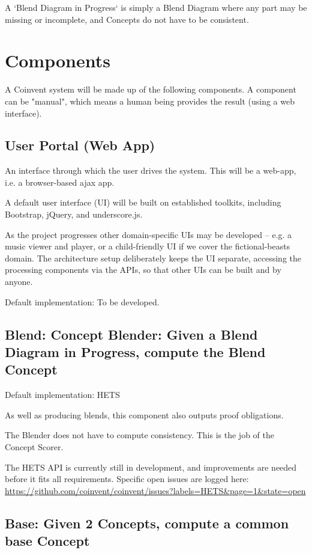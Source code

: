 A `Blend Diagram in Progress` is simply a Blend Diagram where any part may be missing or incomplete, and Concepts do not have to be consistent. 


\section{Components}\label{sec:components}

A Coinvent system will be made up of the following components.
A component can be "manual", which means a human being provides the result (using a web interface).

\subsection{User Portal (Web App)}\label{sec:userportal}
An interface through which the user drives the system. This will be a web-app,
i.e. a browser-based ajax app.

A default user interface (UI) will be built on established toolkits, including Bootstrap, jQuery, and underscore.js.

As the project progresses other domain-specific UIs may be developed -- e.g. a music viewer and player, 
or a child-friendly UI if we cover the fictional-beasts domain. 
The architecture setup deliberately keeps the UI separate, accessing the processing components via the APIs, so that other UIs can be built and by anyone.

Default implementation: To be developed.

\subsection{Blend: Concept Blender: Given a Blend Diagram in Progress, compute the Blend Concept}

Default implementation: HETS

As well as producing blends, this component also outputs proof obligations.

The Blender does not have to compute consistency. This is the job of the Concept Scorer.

The HETS API is currently still in development, and improvements are needed
before it fits all requirements. Specific open issues are logged here: \url{https://github.com/coinvent/coinvent/issues?labels=HETS&page=1&state=open}

\subsection{Base: Given 2 Concepts, compute a common base Concept}

